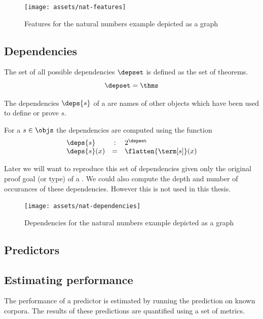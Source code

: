 \begin{figure}[H]
	\centering
	\texttt{[image: assets/nat-features]}
	\caption{Features for the natural numbers example depicted as a graph}
\end{figure}

\subsection{Dependencies}
\label{section:deps}

\begin{definition}\label{def:depset}
  The set of all possible dependencies $\depset$ is defined as the set of theorems.
  $$
  \depset = \thms
  $$
\end{definition}

The dependencies $\deps{s}$ of a \coqobj[s] are names of other objects which have been used to define or prove $s$.

\begin{definition}\label{def:deps}
  For a \coqobj $s \in \objs$ the dependencies are computed using the function
  $$
  \begin{array}{lcl}
    \deps{s} & : & 2^{\depset} \\
    \deps{s}(x) & = & \flatten{\term[s]}(x)
  \end{array}
  $$
\end{definition}

Later we will want to reproduce this set of dependencies given only the original proof goal (or type) of a \coqobj.
We could also compute the depth and number of occurances of these dependencies.
However this is not used in this thesis.

\begin{figure}[H]
	\centering
	\texttt{[image: assets/nat-dependencies]}
	\caption{Dependencies for the natural numbers example depicted as a graph}
\end{figure}

\subsection{Predictors}
\label{section:predictors}


\subsection{Estimating performance}
\label{section:estimating-performance}
The performance of a predictor is estimated by running the prediction on known corpora.
The results of these predictions are quantified using a set of metrics.

